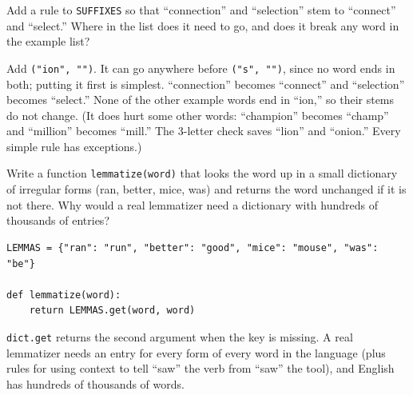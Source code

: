 \begin{Exercise}[label=stem4, title={A rule for -ion}]
Add a rule to \verb|SUFFIXES| so that ``connection'' and ``selection'' stem to ``connect'' and ``select.'' Where
in the list does it need to go, and does it break any word in the example list?
\end{Exercise}
\begin{Answer}[ref=stem4]
Add \verb|("ion", "")|. It can go anywhere before \verb|("s", "")|, since no word ends in both; putting it first is
simplest. ``connection'' becomes ``connect'' and ``selection'' becomes ``select.'' None of the other example words
end in ``ion,'' so their stems do not change. (It does hurt some other words: ``champion'' becomes ``champ'' and ``million''
becomes ``mill.'' The 3-letter check saves ``lion'' and ``onion.'' Every simple rule has exceptions.)
\end{Answer}

\begin{Exercise}[label=stem5, title={A tiny lemmatizer}]
Write a function \verb|lemmatize(word)| that looks the word up in a small dictionary of irregular forms
(ran, better, mice, was) and returns the word unchanged if it is not there. Why would a real lemmatizer need a dictionary with hundreds of thousands of entries?
\end{Exercise}
\begin{Answer}[ref=stem5]
\begin{verbatim}
LEMMAS = {"ran": "run", "better": "good", "mice": "mouse", "was": "be"}

def lemmatize(word):
    return LEMMAS.get(word, word)
\end{verbatim}
\verb|dict.get| returns the second argument when the key is missing. A real lemmatizer needs an entry for every
form of every word in the language (plus rules for using context to tell ``saw'' the verb from ``saw'' the
tool), and English has hundreds of thousands of words.
\end{Answer}
